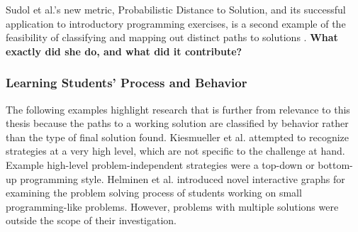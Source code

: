 \documentclass[12pt]{article}
\begin{document}
Sudol et al.'s new metric, Probabilistic Distance to Solution, and its successful application to introductory programming exercises, is a second example of the feasibility of classifying and mapping out distinct paths to solutions \cite{sudol12}. \textbf{What exactly did she do, and what did it contribute?}

\subsubsection{Learning Students' Process and Behavior}

The following examples highlight research that is further from relevance to this thesis because the paths to a working solution are classified by behavior rather than the type of final solution found. Kiesmueller et al. \cite{Kiesmueller} attempted to recognize strategies at a very high level, which are not specific to the challenge at hand. Example high-level problem-independent strategies were a top-down or bottom-up programming style. Helminen et al. \cite{ICERHelminen} introduced novel interactive graphs for examining the problem solving process of students working on small programming-like problems. However, problems with multiple solutions were outside the scope of their investigation.



%
%

\end{document}
